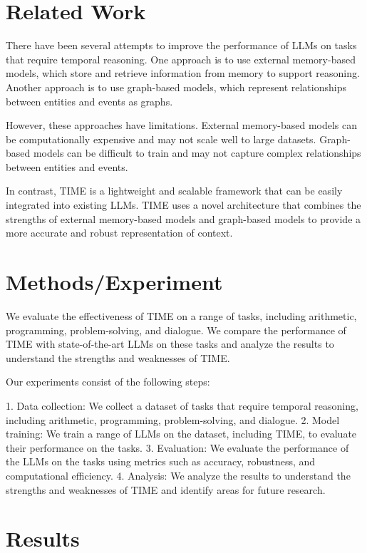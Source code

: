 \documentclass[11pt]{article}
\begin{document}
\section{Related Work}

There have been several attempts to improve the performance of LLMs on tasks that require temporal reasoning. One approach is to use external memory-based models, which store and retrieve information from memory to support reasoning. Another approach is to use graph-based models, which represent relationships between entities and events as graphs.

However, these approaches have limitations. External memory-based models can be computationally expensive and may not scale well to large datasets. Graph-based models can be difficult to train and may not capture complex relationships between entities and events.

In contrast, TIME is a lightweight and scalable framework that can be easily integrated into existing LLMs. TIME uses a novel architecture that combines the strengths of external memory-based models and graph-based models to provide a more accurate and robust representation of context.

\section{Methods/Experiment}

We evaluate the effectiveness of TIME on a range of tasks, including arithmetic, programming, problem-solving, and dialogue. We compare the performance of TIME with state-of-the-art LLMs on these tasks and analyze the results to understand the strengths and weaknesses of TIME.

Our experiments consist of the following steps:

1. Data collection: We collect a dataset of tasks that require temporal reasoning, including arithmetic, programming, problem-solving, and dialogue.
2. Model training: We train a range of LLMs on the dataset, including TIME, to evaluate their performance on the tasks.
3. Evaluation: We evaluate the performance of the LLMs on the tasks using metrics such as accuracy, robustness, and computational efficiency.
4. Analysis: We analyze the results to understand the strengths and weaknesses of TIME and identify areas for future research.

\section{Results}
\end{document}
